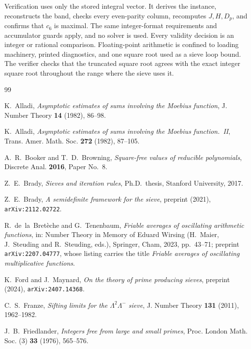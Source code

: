 \documentclass[11pt,a4paper]{article}
\theoremstyle{plain}
\theoremstyle{definition}
\theoremstyle{remark}
\begin{document}
Verification uses only the stored integral vector. It derives the instance, reconstructs the band,
checks every even-parity column, recomputes $J,H,D_p$, and confirms that $c_6$ is maximal.
The same integer-format requirements and accumulator guards apply, and no solver is used.
Every validity decision is an integer or rational comparison. Floating-point arithmetic is confined
to loading machinery, printed diagnostics, and one square root used as a sieve loop bound.
The verifier checks that the truncated square root agrees with the exact integer square root
throughout the range where the sieve uses it.

\begin{thebibliography}{99}

K.~Alladi,
\emph{Asymptotic estimates of sums involving the Moebius function},
J. Number Theory \textbf{14} (1982), 86--98.

K.~Alladi,
\emph{Asymptotic estimates of sums involving the Moebius function.\ II},
Trans. Amer. Math. Soc. \textbf{272} (1982), 87--105.

A.~R.~Booker and T.~D.~Browning,
\emph{Square-free values of reducible polynomials},
Discrete Anal. \textbf{2016}, Paper No.~8.

Z.~E.~Brady,
\emph{Sieves and iteration rules},
Ph.D.\ thesis, Stanford University, 2017.

Z.~E.~Brady,
\emph{A semidefinite framework for the sieve},
preprint (2021), \texttt{arXiv:2112.02722}.

R.~de~la~Bret\`eche and G.~Tenenbaum,
\emph{Friable averages of oscillating arithmetic functions},
in: Number Theory in Memory of Eduard Wirsing (H.~Maier, J.~Steuding and R.~Steuding, eds.),
Springer, Cham, 2023, pp.~43--71; preprint \texttt{arXiv:2207.04777}, whose listing carries the title
\emph{Friable averages of oscillating multiplicative functions}.

K.~Ford and J.~Maynard,
\emph{On the theory of prime producing sieves},
preprint (2024), \texttt{arXiv:2407.14368}.

C.~S.~Franze,
\emph{Sifting limits for the $\Lambda^{2}\Lambda^{-}$ sieve},
J. Number Theory \textbf{131} (2011), 1962--1982.

J.~B.~Friedlander,
\emph{Integers free from large and small primes},
Proc. London Math. Soc. (3) \textbf{33} (1976), 565--576.


\end{thebibliography}
\end{document}
